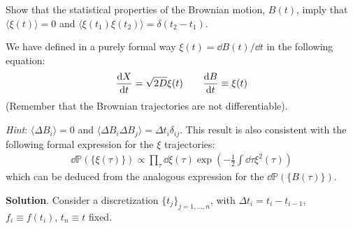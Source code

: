 \documentclass[../template.tex]{subfiles}
\begin{document}
\begin{exo}
    Show that the statistical properties of the Brownian motion, $B(t)$, imply that $\langle \xi(t) \rangle = 0$ and $\langle \xi(t_1) \xi(t_2) \rangle = \delta(t_2 - t_1)$.

    We have defined in a purely formal way $\xi(t) = \dd{B(t)}/\dd{t}$ in the following equation:
    \begin{align*}
        \dv{X}{t}(t) = \sqrt{2D} \xi(t) \qquad \dv{B}{t}(t) \equiv \xi(t)
    \end{align*}
    (Remember that the Brownian trajectories are not differentiable).
    \medskip

    \textit{Hint}: $\langle \Delta B_i \rangle = 0$ and $\langle \Delta B_i \Delta B_j \rangle = \Delta t_i \delta_{ij}$. This result is also consistent with the following formal expression for the $\xi$ trajectories:
    \begin{align*}
        \dd{\mathbb{P}}(\{\xi(\tau)\}) \propto \prod_{\tau} \dd{\xi(\tau)} \exp\left(-\frac{1}{2} \int \dd{\tau} \xi^2(\tau) \right)
    \end{align*}
    which can be deduced from the analogous expression for the $\dd{\mathbb{P}}(\{B(\tau)\})$.

    \medskip

    \textbf{Solution}. Consider a discretization $\{t_j\}_{j=1,\dots,n}$, with $\Delta t_i = t_i - t_{i-1}$, $f_i \equiv f(t_i)$, $t_n \equiv t$ fixed.
    

\end{exo}
\end{document}
